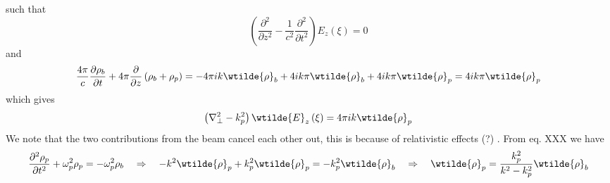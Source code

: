 such that 
\begin{equation}
\left(\frac{\partial^2 }{\partial z^2}-\frac{1}{c^2}\frac{\partial^2 }{\partial t^2}\right)E_z(\xi)=0
\end{equation}
and
\begin{equation}
\frac{4\pi}{c}\frac{\partial {\rho}_b}{\partial t}+4\pi\frac{\partial }{\partial z}\left({\rho}_b+{\rho}_p\right)=-4\pi i k\wtilde{\rho}_b+4i k\pi\wtilde{\rho}_b+4i k\pi\wtilde{\rho}_p=4i k\pi\wtilde{\rho}_p
\end{equation}
which gives 
\begin{equation}
\left(\nabla^2_{\perp}-k^2_p\right)\wtilde{E}_z\left(\xi\right)=4\pi i k\wtilde{\rho}_p
\end{equation}
We note that the two contributions from the beam cancel each other out, this is because of relativistic effects (?) \citep{Gessner2016}.
From eq. XXX we have
\begin{equation}
\frac{\partial^2{\rho}_p}{\partial t^2}+\omega_p^2{\rho}_p=-\omega_p^2{\rho}_b \quad \Rightarrow\quad
-k^2\wtilde{\rho}_p+k_p^2\wtilde{\rho}_p=-k_p^2\wtilde{\rho}_b \quad \Rightarrow\quad \wtilde{\rho}_p=\frac{k_p^2}{k^2-k_p^2}\wtilde{\rho}_b
\end{equation}

